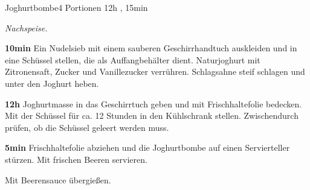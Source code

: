 \documentclass[../recipe-collections/cooking.tex]{subfiles}
\begin{document}
\begin{recipe}{Joghurtbombe}{4 Portionen }{12h , 15min }

  \freeform{}\textit{Nachspeise.}


  \textbf{10min}
  Ein Nudelsieb mit einem sauberen Geschirrhandtuch auskleiden und in eine Schüssel stellen, die als Auffangbehälter dient.
  Naturjoghurt mit Zitronensaft, Zucker und Vanillezucker verrühren.
  Schlagsahne steif schlagen und unter den Joghurt heben.

  \newstep{}\textbf{12h}
  Joghurtmasse in das Geschirrtuch geben und mit Frischhaltefolie bedecken.
  Mit der Schüssel für ca. 12 Stunden in den Kühlschrank stellen.
  Zwischendurch prüfen, ob die Schüssel geleert werden muss.


  \textbf{5min}
  Frischhaltefolie abziehen und die Joghurtbombe auf einen Servierteller stürzen.
  Mit frischen Beeren servieren.

  \freeform{}\hrulefill{}

  \freeform{}
  Mit Beerensauce übergießen.

\end{recipe}
\end{document}
